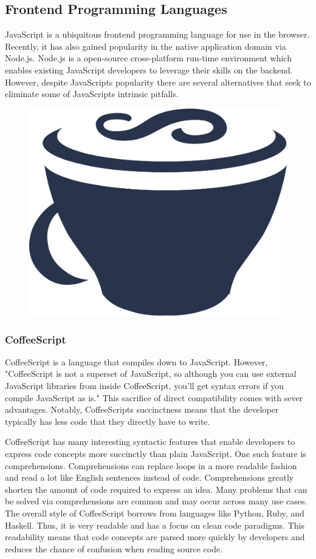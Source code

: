 \documentclass[12pt]{article}
\begin{document}
\subsection{Frontend Programming Languages}

JavaScript is a ubiquitous frontend programming language for use in the browser. Recently, it has also gained popularity in the native application domain via Node.js. Node.js is a open-source cross-platform run-time environment which enables existing JavaScript developers to leverage their skills on the backend. However, despite JavaScripts popularity there are several alternatives that seek to eliminate some of JavaScripts intrinsic pitfalls.

\begin{figure}[h]
	\centering
	\includegraphics[width=0.25\linewidth]{coffeescript}
\end{figure}

\subsubsection{CoffeeScript}

CoffeeScript is a language that compiles down to JavaScript.\cite{coffeescriptlittlebook} However, "CoffeeScript is not a superset of JavaScript, so although you can use external JavaScript libraries from inside CoffeeScript, you'll get syntax errors if you compile JavaScript as is."\cite{coffeescriptlittlebook} This sacrifice of direct compatibility comes with sever advantages. Notably, CoffeeScripts succinctness means that the developer typically has less code that they directly have to write.

CoffeeScript has many interesting syntactic features that enable developers to express code concepts more succinctly than plain JavaScript. One such feature is comprehensions.\cite{coffeescriptguide} Comprehensions can replace loops in a more readable fashion and read a lot like English sentences instead of code. Comprehensions greatly shorten the amount of code required to express an idea. Many problems that can be solved via comprehensions are common and may occur across many use cases. The overall style of CoffeeScript borrows from languages like Python, Ruby, and Haskell. Thus, it is very readable and has a focus on clean code paradigms. This readability means that code concepts are parsed more quickly by developers and reduces the chance of confusion when reading source code.
\end{document}
